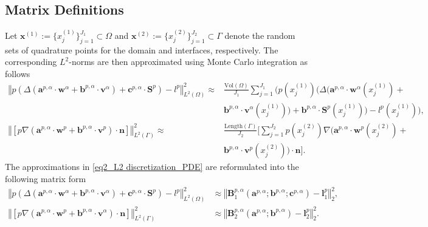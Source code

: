 \documentclass[oneside]{article}
\newcounter{reviewer}
\newcounter{point}[reviewer]
\begin{document}
\subsection{Matrix Definitions}\label{Matrix Definitions}
Let $\mathbf{x}^{(1)} := \{ x^{(1)}_j \}_{j=1}^{J_1} \subset \Omega$ and $\mathbf{x}^{(2)}:= \{ x^{(2)}_j \}_{j=1}^{J_2} \subset \Gamma$ denote the random sets of quadrature points for the domain and interfaces, respectively. The corresponding $L^2$-norms are then approximated using Monte Carlo integration as follows
\begin{equation}\label{eq2_L2 discretization_PDE}
    \begin{array}{rl}
    \left\Vert p \left( \Delta \left(\mathbf{a}^{p, \alpha}\cdot\mathbf{w}^{\alpha} + \mathbf{b}^{p, \alpha}\cdot\mathbf{v}^{\alpha}\right) + {\mathbf{c}^{p, \alpha}}\cdot \mathbf{S}^{p} \right)- l^p \right\Vert_{L^2(\Omega)}^2 \approx & \displaystyle \frac{\text{Vol}(\Omega)}{J_1} \sum_{j = 1}^{J_1} \Big( p(x_j^{(1)}) \Big( \Delta \Big(\mathbf{a}^{p, \alpha}\cdot\mathbf{w}^{\alpha}(x_j^{(1)}) +\\ & \mathbf{b}^{p, \alpha}\cdot\mathbf{v}^{\alpha}(x_j^{(1)})\Big) + 
    {\mathbf{b}^{p, \alpha}}\cdot \mathbf{S}^{p}(x_j^{(1)}) \Big) - l^p(x_j^{(1)}) \Big), \\
    
    \left\Vert [p \nabla (\mathbf{a}^{p, \alpha}\cdot \mathbf{w}^{p} + \mathbf{b}^{p, \alpha}\cdot \mathbf{v}^{p}) \cdot \mathbf{n}] \right\Vert^2_{L^2(\Gamma)} \approx &\displaystyle \frac{\text{Length}(\Gamma)}{J_2} \Big[\sum_{j = 1}^{J_2} p(x_j^{(2)}) \nabla (\mathbf{a}^{p, \alpha}\cdot \mathbf{w}^{p}(x_j^{(2)}) + \\
    
    &\mathbf{b}^{p, \alpha}\cdot \mathbf{v}^{p}(x_j^{(2)})) \cdot \mathbf{n} \Big]. 
    \end{array}
\end{equation}
The approximations in \eqref{eq2_L2 discretization_PDE} are reformulated into the following matrix form
\begin{equation}
    \begin{array}{rl}\left\Vert p \left( \Delta \left(\mathbf{a}^{p, \alpha}\cdot\mathbf{w}^{\alpha} + \mathbf{b}^{p, \alpha}\cdot\mathbf{v}^{\alpha}\right) + {\mathbf{c}^{p, \alpha}}\cdot \mathbf{S}^{p} \right) - l^p \right\Vert_{L^2(\Omega)}^2 &\approx \left\Vert \mathbf{B}_1^{p, \alpha}(\mathbf{a}^{p, \alpha};\mathbf{b}^{p, \alpha};\mathbf{c}^{p, \alpha}) - \mathbf{l}^p_1 \right\Vert_2^2, \\
\label{eq2_L2 discretization_tc_Matrix}\left\Vert [p \nabla (\mathbf{a}^{p, \alpha}\cdot \mathbf{w}^{p} + \mathbf{b}^{p, \alpha}\cdot\mathbf{v}^{\alpha}) \cdot \mathbf{n}] \right\Vert^2_{L^2(\Gamma)} &\approx \left\Vert \mathbf{B}_2^{p, \alpha} (\mathbf{a}^{p, \alpha};\mathbf{b}^{p, \alpha}) - \mathbf{l}^p_2\right\Vert_2^2. 
\end{array}
\end{equation}
\end{document}
